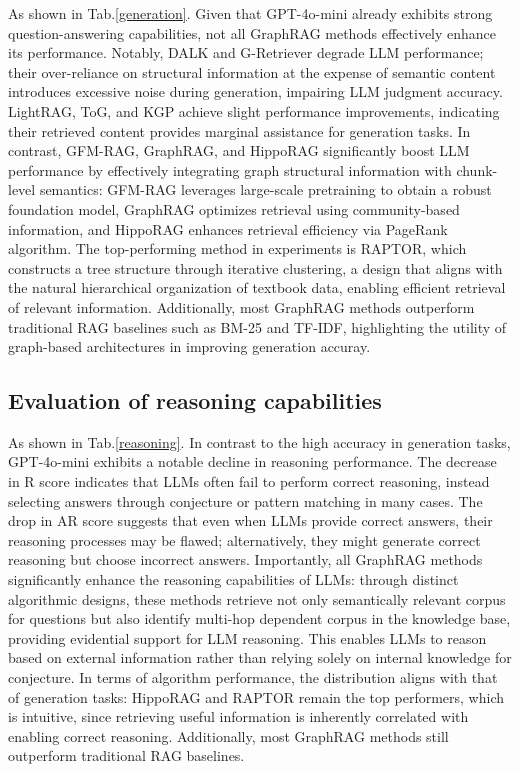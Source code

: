 \documentclass{article}
\begin{document}
As shown in Tab.\ref{generation}. Given that GPT-4o-mini already exhibits strong question-answering capabilities, not all GraphRAG methods effectively enhance its performance. Notably, DALK and G-Retriever degrade LLM performance; their over-reliance on structural information at the expense of semantic content introduces excessive noise during generation, impairing LLM judgment accuracy. LightRAG, ToG, and KGP achieve slight performance improvements, indicating their retrieved content provides marginal assistance for generation tasks. In contrast, GFM-RAG, GraphRAG, and HippoRAG significantly boost LLM performance by effectively integrating graph structural information with chunk-level semantics: GFM-RAG leverages large-scale pretraining to obtain a robust foundation model, GraphRAG optimizes retrieval using community-based information, and HippoRAG enhances retrieval efficiency via PageRank algorithm. The top-performing method in experiments is RAPTOR, which constructs a tree structure through iterative clustering, a design that aligns with the natural hierarchical organization of textbook data, enabling efficient retrieval of relevant information. Additionally, most GraphRAG methods outperform traditional RAG baselines such as BM-25 and TF-IDF, highlighting the utility of graph-based architectures in improving generation accuray.  

\subsection{Evaluation of reasoning capabilities}
As shown in Tab.\ref{reasoning}. In contrast to the high accuracy in generation tasks, GPT-4o-mini exhibits a notable decline in reasoning performance. The decrease in R score indicates that LLMs often fail to perform correct reasoning, instead selecting answers through conjecture or pattern matching in many cases. The drop in AR score suggests that even when LLMs provide correct answers, their reasoning processes may be flawed; alternatively, they might generate correct reasoning but choose incorrect answers. Importantly, all GraphRAG methods significantly enhance the reasoning capabilities of LLMs: through distinct algorithmic designs, these methods retrieve not only semantically relevant corpus for questions but also identify multi-hop dependent corpus in the knowledge base, providing evidential support for LLM reasoning. This enables LLMs to reason based on external information rather than relying solely on internal knowledge for conjecture. In terms of algorithm performance, the distribution aligns with that of generation tasks: HippoRAG and RAPTOR remain the top performers, which is intuitive, since retrieving useful information is inherently correlated with enabling correct reasoning. Additionally, most GraphRAG methods still outperform traditional RAG baselines.
\end{document}
